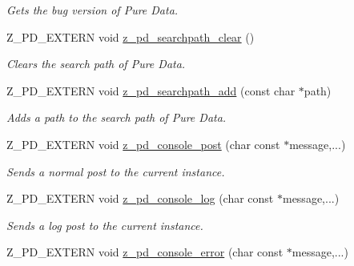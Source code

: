 \begin{DoxyCompactItemize}
\begin{DoxyCompactList}\small\item\em Gets the bug version of Pure Data. \end{DoxyCompactList}\item 
Z\-\_\-\-P\-D\-\_\-\-E\-X\-T\-E\-R\-N void \hyperlink{group__enviroment_gacdb5b870805ee86a9dbdac1af3058abb}{z\-\_\-pd\-\_\-searchpath\-\_\-clear} ()
\begin{DoxyCompactList}\small\item\em Clears the search path of Pure Data. \end{DoxyCompactList}\item 
Z\-\_\-\-P\-D\-\_\-\-E\-X\-T\-E\-R\-N void \hyperlink{group__enviroment_gaf2ca5c39f6856052957aba2b16a8a2a7}{z\-\_\-pd\-\_\-searchpath\-\_\-add} (const char $\ast$path)
\begin{DoxyCompactList}\small\item\em Adds a path to the search path of Pure Data. \end{DoxyCompactList}\item 
\hypertarget{group__enviroment_ga1126f0ab6b091c20db557d82e1456eb9}{Z\-\_\-\-P\-D\-\_\-\-E\-X\-T\-E\-R\-N void \hyperlink{group__enviroment_ga1126f0ab6b091c20db557d82e1456eb9}{z\-\_\-pd\-\_\-console\-\_\-post} (char const $\ast$message,...)}\label{group__enviroment_ga1126f0ab6b091c20db557d82e1456eb9}

\begin{DoxyCompactList}\small\item\em Sends a normal post to the current instance. \end{DoxyCompactList}\item 
\hypertarget{group__enviroment_gae82b7e41427836216b4f0989b48e2916}{Z\-\_\-\-P\-D\-\_\-\-E\-X\-T\-E\-R\-N void \hyperlink{group__enviroment_gae82b7e41427836216b4f0989b48e2916}{z\-\_\-pd\-\_\-console\-\_\-log} (char const $\ast$message,...)}\label{group__enviroment_gae82b7e41427836216b4f0989b48e2916}

\begin{DoxyCompactList}\small\item\em Sends a log post to the current instance. \end{DoxyCompactList}\item 
\hypertarget{group__enviroment_ga2773de983ca685dca257fee4c41e748e}{Z\-\_\-\-P\-D\-\_\-\-E\-X\-T\-E\-R\-N void \hyperlink{group__enviroment_ga2773de983ca685dca257fee4c41e748e}{z\-\_\-pd\-\_\-console\-\_\-error} (char const $\ast$message,...)}\label{group__enviroment_ga2773de983ca685dca257fee4c41e748e}


\end{DoxyCompactItemize}
